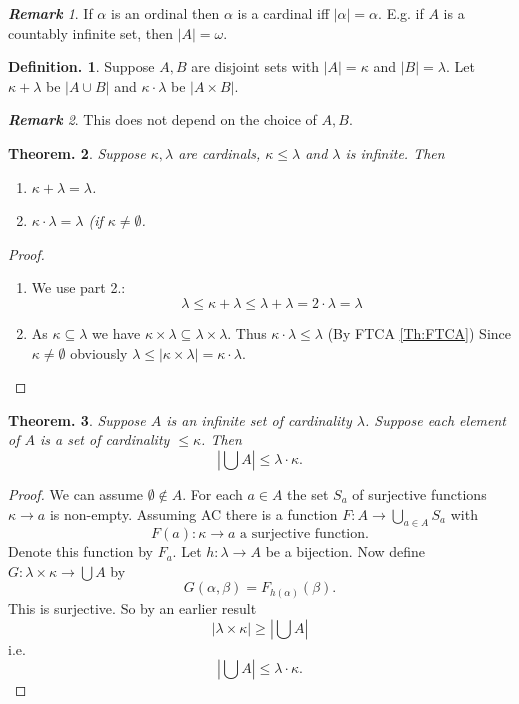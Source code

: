 \documentclass[a4paper,oneside,11pt,DIV=12,parskip=half]{scrartcl}
\theoremstyle{plain}
\newtheorem{theorem}{Theorem.}[section]
\theoremstyle{definition}
\newtheorem{definition}[theorem]{Definition.}
\newtheorem{remark, definition}[theorem]{Remark and Definition.}
\newtheorem{lemma, definition}[theorem]{Lemma and Definition.}
\newtheorem{theorem, definition}[theorem]{Theorem and Definition.}
\theoremstyle{remark}
\newtheorem*{remark}{\textbf{Remark}}
\newtheorem*{remark, example}{\textbf{Remark and Exercise}}
\begin{document}
\begin{remark}
If $\alpha$ is an ordinal then $\alpha$ is a cardinal iff $|\alpha| = \alpha$. E.g. if $A$ is a countably infinite set, then $|A| = \omega$.
\end{remark}

\begin{definition}
Suppose $A,B$ are disjoint sets with $|A| = \kappa$ and $|B| = \lambda$. Let $\kappa + \lambda$ be $|A \cup B|$ and $\kappa \cdot \lambda$ be $|A \times B|$.
\end{definition}

 \begin{remark}
 This does not depend on the choice of $A,B$.
 \end{remark}
 
 \begin{theorem}
 Suppose $\kappa,\lambda$ are cardinals, $\kappa \leq \lambda$ and $\lambda$ is infinite. Then
 \begin{enumerate}
     \item $\kappa + \lambda = \lambda$.
     \item $\kappa \cdot \lambda = \lambda$ (if $\kappa \neq \emptyset$.
 \end{enumerate}
 \end{theorem}
 
\begin{proof}
\begin{enumerate}
    \item We use part 2.:
    \[ \lambda \leq \kappa + \lambda \leq \lambda + \lambda = 2 \cdot \lambda = \lambda \]
    \item As $\kappa \subseteq \lambda$ we have $\kappa \times \lambda \subseteq \lambda \times \lambda$. Thus $\kappa \cdot \lambda \leq \lambda$ (By FTCA \ref{Th:FTCA})
    Since $\kappa \neq \emptyset$ obviously $\lambda \leq |\kappa \times \lambda| = \kappa \cdot \lambda$.
\end{enumerate}
\end{proof}

\begin{theorem}
Suppose $A$ is an infinite set of cardinality $\lambda$. Suppose each element of $A$ is a set of cardinality $\leq \kappa$. Then
\[ |\bigcup A| \leq \lambda \cdot \kappa. \]
\end{theorem}

\begin{proof}
We can assume $ \emptyset \not \in A$. For each $a \in A$ the set $S_a$ of surjective functions $\kappa \rightarrow a$ is non-empty. Assuming AC there is a function $F: A \rightarrow \bigcup_{a \in A} S_a$ with
\[ F(a): \kappa \rightarrow a \text{ a surjective function.} \] Denote this function by $F_a$. Let $h: \lambda \rightarrow A$ be a bijection. Now define $G : \lambda \times \kappa \rightarrow \bigcup A$ by 
\[G(\alpha,\beta) = F_{h(\alpha)}(\beta).\] This is surjective. So by an earlier result
\[ |\lambda \times \kappa| \geq |\bigcup A| \] i.e.
\[ | \bigcup A | \leq \lambda \cdot \kappa. \]
\end{proof}
\end{document}
